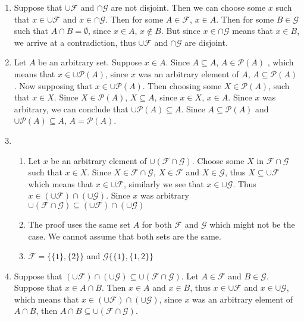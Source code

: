 \begin{enumerate}
    \item
    Suppose that $\cup \mathscr{F}$ and $\cap \mathscr{G}$ are not disjoint. Then we can choose some $x$ such that $x \in \cup \mathscr{F}$ and $x \in \cap \mathscr{G}$. Then for some $A \in \mathscr{F}$, $x \in A$. Then for some $B \in \mathscr{G}$ such that $A \cap B = \emptyset$, since $x \in A$, $x \notin B$. But since $x \in \cap \mathscr{G}$ means that $x \in B$, we arrive at a contradiction, thus $\cup \mathscr{F}$ and $\cap \mathscr{G}$ are disjoint.
    \item
    Let $A$ be an arbitrary set. Suppose $x \in A$. Since $A \subseteq A$, $A \in \mathscr{P}(A)$ , which means that $x \in \cup \mathscr{P}(A)$, since $x$ was an arbitrary element of $A$, $A \subseteq \mathscr{P}(A)$.
    Now supposing that $x \in \cup \mathscr{P}(A)$. Then choosing some $X \in \mathscr{P}(A)$, such that $x \in X$. Since $X \in \mathscr{P}(A)$, $X \subseteq A$, since $x \in X$, $x \in A$. Since $x$ was arbitrary, we can conclude that $\cup \mathscr{P}(A) \subseteq A$.
    Since $A \subseteq \mathscr{P}(A)$ and $\cup \mathscr{P}(A) \subseteq A$, $A = \mathscr{P}(A)$.
    \item
    \begin{enumerate}
        \item 
    Let $x$ be an arbitrary element of $\cup (\mathscr{F} \cap \mathscr{G})$. Choose some $X$ in $\mathscr{F} \cap \mathscr{G}$ such that $x \in X$. Since $X \in \mathscr{F} \cap \mathscr{G}$, $X \in \mathscr{F}$ and $X \in \mathscr{G}$, thus $X \subseteq \cup \mathscr{F}$ which means that $x \in \cup \mathscr{F}$, similarly we see that $x \in \cup \mathscr{G}$. Thus $x \in (\cup \mathscr{F}) \cap (\cup \mathscr{G})$. Since $x$ was arbitrary $\cup (\mathscr{F} \cap \mathscr{G}) \subseteq (\cup \mathscr{F}) \cap (\cup \mathscr{G})$
        \item 
    The proof uses the same set $A$ for both $\mathscr{F}$ and $\mathscr{G}$ which might not be the case. We cannot assume that both sets are the same.
        \item 
    $\mathscr{F} = \{\{1\}, \{2\}\}$ and $\mathscr{G}\{\{1\}, \{1,2\}\}$
    \end{enumerate}
    \item
    Suppose that $(\cup \mathscr{F}) \cap (\cup \mathscr{G}) \subseteq \cup (\mathscr{F} \cap \mathscr{G})$. Let $A \in \mathscr{F}$ and $B \in \mathscr{G}$. Suppose that $x \in A \cap B$. Then $x \in A$ and $x \in B$, thus $x \in \cup \mathscr{F}$ and $x \in \cup \mathscr{G}$, which means that $x \in (\cup \mathscr{F}) \cap (\cup \mathscr{G})$, since $x$ was an arbitrary element of $A \cap B$, then $A \cap B \subseteq \cup (\mathscr{F} \cap \mathscr{G})$. 
    

\end{enumerate}
